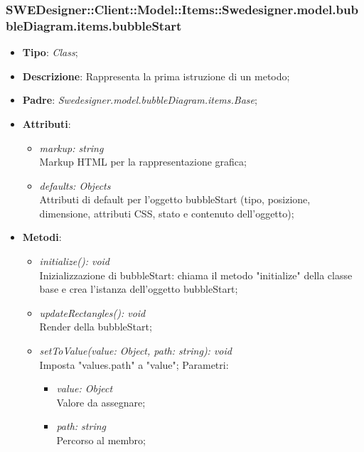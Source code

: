 \documentclass[../DefinizioneDiProdotto.tex]{subfiles}
\begin{document}
			\subsubsection{SWEDesigner::Client::Model::Items::Swedesigner.model.bubbleDiagram.items.bubbleStart}
			\hypertarget{SWEDesigner::Client::Model::Items::Swedesigner.model.bubbleDiagram.items.bubbleStart}{}
			\begin{itemize}
				\item \textbf{Tipo}: \emph{Class};
				\item \textbf{Descrizione}: Rappresenta la prima istruzione di un metodo;
				\item \textbf{Padre}: \emph{Swedesigner.model.bubbleDiagram.items.Base};
				\item \textbf{Attributi}:
				\begin{itemize}
					\item \emph{markup: string}\\
					Markup HTML per la rappresentazione grafica;
					\item \emph{defaults: Objects}\\
					Attributi di default per l'oggetto bubbleStart (tipo, posizione, dimensione, attributi CSS, stato e contenuto dell'oggetto);
				\end{itemize}
				\item \textbf{Metodi}:
				\begin{itemize}
					\item \emph{initialize(): void}\\
					Inizializzazione di bubbleStart: chiama il metodo "initialize" della classe base e crea l'istanza dell'oggetto bubbleStart;
					\item \emph{updateRectangles(): void}\\
					Render della bubbleStart;
					\item \emph{setToValue(value: Object, path: string): void}\\
					Imposta "values.path" a "value";
					Parametri:
					\begin{itemize}
						\item \emph{value: Object} \\
						Valore da assegnare;
						\item \emph{path: string} \\
						Percorso al membro;
					\end{itemize}
				\end{itemize}
			\end{itemize}
			
\end{document}
